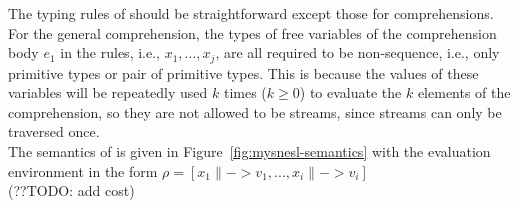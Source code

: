 The typing rules of \mysnesl should be straightforward except those for comprehensions. 
For the general comprehension, the types of free variables of the comprehension body $e_1$ in the rules, i.e., $x_1,...,x_j$, are all required 
to be non-sequence, i.e., only primitive types or pair of primitive types.
This is because the values of these variables will be repeatedly used $k$ times ($k \ge 0$) to evaluate the $k$ elements of the comprehension,
so they are not allowed to be streams, since streams can only be traversed once. \\


The semantics of \mysnesl is given in Figure~\ref{fig:mysnesl-semantics} with the evaluation environment in the form $ \rho = [x_1 \|-> v_1,...,x_i \|-> v_i]$ \\
 (??TODO: add cost) \\


